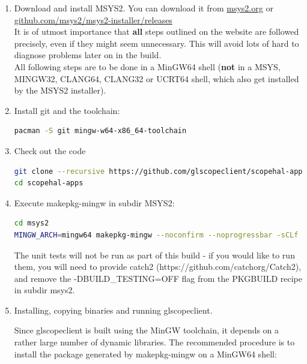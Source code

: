 \begin{enumerate}

\item Download and install MSYS2. You can download it from \href{https://www.msys2.org/}{msys2.org} or \href{https://github.com/msys2/msys2-installer/releases}{github.com/msys2/msys2-installer/releases}\\
It is of utmost importance that \textbf{all} steps outlined on the website are followed precisely, even if they might
seem unnecessary.
This will avoid lots of hard to diagnose problems later on in the build.\\

All following steps are to be done in a MinGW64 shell (\textbf{not} in a MSYS, MINGW32, CLANG64, CLANG32 or UCRT64 shell,
which also get installed by the MSYS2 installer).

\item Install git and the toolchain:

\begin{lstlisting}[language=sh, numbers=none]
pacman -S git mingw-w64-x86_64-toolchain
\end{lstlisting}

\item Check out the code

\begin{lstlisting}[language=sh, numbers=none]
git clone --recursive https://github.com/glscopeclient/scopehal-apps
cd scopehal-apps
\end{lstlisting}

\item Execute makepkg-mingw in subdir MSYS2:

\begin{lstlisting}[language=sh, numbers=none]
cd msys2
MINGW_ARCH=mingw64 makepkg-mingw --noconfirm --noprogressbar -sCLf
\end{lstlisting}

The unit tests will not be run as part of this build - if you would like to run them, you will need to provide catch2
(https://github.com/catchorg/Catch2), and remove the -DBUILD\_TESTING=OFF flag from the PKGBUILD recipe in subdir
msys2.

\item Installing, copying binaries and running glscopeclient.

Since glscopeclient is built using the MinGW toolchain, it depends on a rather large number of dynamic libraries.
The recommended procedure is to install the package generated by makepkg-mingw on a MinGW64 shell:


\end{enumerate}
